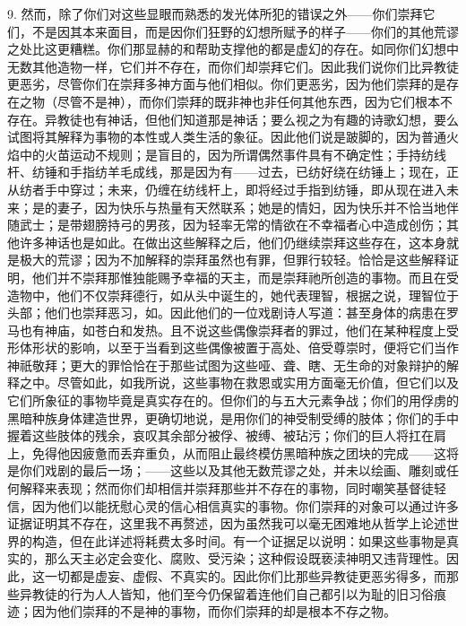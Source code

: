9. 然而，除了你们对这些显眼而熟悉的发光体所犯的错误之外——你们崇拜它们，不是因其本来面目，而是因你们狂野的幻想所赋予的样子——你们的其他荒谬之处比这更糟糕。你们那显赫的和帮助支撑他的都是虚幻的存在。如同你们幻想中无数其他造物一样，它们并不存在，而你们却崇拜它们。因此我们说你们比异教徒更恶劣，尽管你们在崇拜多神方面与他们相似。你们更恶劣，因为他们崇拜的是存在之物（尽管不是神），而你们崇拜的既非神也非任何其他东西，因为它们根本不存在。异教徒也有神话，但他们知道那是神话；要么视之为有趣的诗歌幻想，要么试图将其解释为事物的本性或人类生活的象征。因此他们说是跛脚的，因为普通火焰中的火苗运动不规则；是盲目的，因为所谓偶然事件具有不确定性；手持纺线杆、纺锤和手指纺羊毛成线，那是因为有——过去，已纺好绕在纺锤上；现在，正从纺者手中穿过；未来，仍缠在纺线杆上，即将经过手指到纺锤，即从现在进入未来；是的妻子，因为快乐与热量有天然联系；她是的情妇，因为快乐并不恰当地伴随武士；是带翅膀持弓的男孩，因为轻率无常的情欲在不幸福者心中造成创伤；其他许多神话也是如此。在做出这些解释之后，他们仍继续崇拜这些存在，这本身就是极大的荒谬；因为不加解释的崇拜虽然也有罪，但罪行较轻。恰恰是这些解释证明，他们并不崇拜那惟独能赐予幸福的天主，而是崇拜祂所创造的事物。而且在受造物中，他们不仅崇拜德行，如从头中诞生的，她代表理智，根据之说，理智位于头部；他们也崇拜恶习，如。因此他们的一位戏剧诗人写道：甚至身体的病患在罗马也有神庙，如苍白和发热。且不说这些偶像崇拜者的罪过，他们在某种程度上受形体形状的影响，以至于当看到这些偶像被置于高处、倍受尊崇时，便将它们当作神祇敬拜；更大的罪恰恰在于那些试图为这些哑、聋、瞎、无生命的对象辩护的解释之中。尽管如此，如我所说，这些事物在救恩或实用方面毫无价值，但它们以及它们所象征的事物毕竟是真实存在的。但你们的与五大元素争战；你们的用俘虏的黑暗种族身体建造世界，更确切地说，是用你们的神受制受缚的肢体；你们的手中握着这些肢体的残余，哀叹其余部分被俘、被缚、被玷污；你们的巨人将扛在肩上，免得他因疲惫而丢弃重负，从而阻止最终模仿黑暗种族之团块的完成——这将是你们戏剧的最后一场；——这些以及其他无数荒谬之处，并未以绘画、雕刻或任何解释来表现；然而你们却相信并崇拜那些并不存在的事物，同时嘲笑基督徒轻信，因为他们以能抚慰心灵的信心相信真实的事物。你们崇拜的对象可以通过许多证据证明其不存在，这里我不再赘述，因为虽然我可以毫无困难地从哲学上论述世界的构造，但在此详述将耗费太多时间。有一个证据足以说明：如果这些事物是真实的，那么天主必定会变化、腐败、受污染；这种假设既亵渎神明又违背理性。因此，这一切都是虚妄、虚假、不真实的。因此你们比那些异教徒更恶劣得多，而那些异教徒的行为人人皆知，他们至今仍保留着连他们自己都引以为耻的旧习俗痕迹；因为他们崇拜的不是神的事物，而你们崇拜的却是根本不存之物。\par

